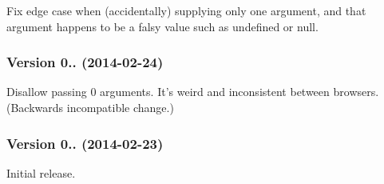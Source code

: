 
\begin{DoxyItemize}
\item Fix edge case when (accidentally) supplying only one argument, and that argument happens to be a falsy value such as {\ttfamily undefined} or {\ttfamily null}.
\end{DoxyItemize}

\subsubsection*{Version 0.. (2014-\/02-\/24)}


\begin{DoxyItemize}
\item Disallow passing 0 arguments. It’s weird and inconsistent between browsers. (Backwards incompatible change.)
\end{DoxyItemize}

\subsubsection*{Version 0.. (2014-\/02-\/23)}


\begin{DoxyItemize}
\item Initial release. 
\end{DoxyItemize}